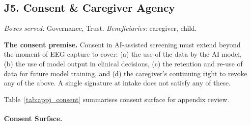 \subsection*{J5. Consent \& Caregiver Agency}
\label{sec:appj_consent}

\noindent\emph{Boxes served:} Governance, Trust. \emph{Beneficiaries:} caregiver, child.

\noindent\textbf{The consent premise.} Consent in AI-assisted screening must extend beyond the moment of EEG capture to cover: (a) the use of the data by the AI model, (b) the use of model output in clinical decisions, (c) the retention and re-use of data for future model training, and (d) the caregiver's continuing right to revoke any of the above. A single signature at intake does not satisfy any of these.

\noindent Table~\ref{tab:appj_consent} summarises consent surface for appendix review.

\paragraph{Consent Surface.}




